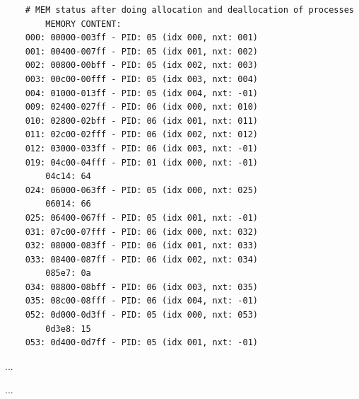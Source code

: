 \documentclass[a4paper]{article}
\begin{document}
	\begin{lstlisting}
	# MEM status after doing allocation and deallocation of processes
    	MEMORY CONTENT: 
    000: 00000-003ff - PID: 05 (idx 000, nxt: 001)
    001: 00400-007ff - PID: 05 (idx 001, nxt: 002)
    002: 00800-00bff - PID: 05 (idx 002, nxt: 003)
    003: 00c00-00fff - PID: 05 (idx 003, nxt: 004)
    004: 01000-013ff - PID: 05 (idx 004, nxt: -01)
    009: 02400-027ff - PID: 06 (idx 000, nxt: 010)
    010: 02800-02bff - PID: 06 (idx 001, nxt: 011)
    011: 02c00-02fff - PID: 06 (idx 002, nxt: 012)
    012: 03000-033ff - PID: 06 (idx 003, nxt: -01)
    019: 04c00-04fff - PID: 01 (idx 000, nxt: -01)
    	04c14: 64
    024: 06000-063ff - PID: 05 (idx 000, nxt: 025)
    	06014: 66
    025: 06400-067ff - PID: 05 (idx 001, nxt: -01)
    031: 07c00-07fff - PID: 06 (idx 000, nxt: 032)
    032: 08000-083ff - PID: 06 (idx 001, nxt: 033)
    033: 08400-087ff - PID: 06 (idx 002, nxt: 034)
    	085e7: 0a
    034: 08800-08bff - PID: 06 (idx 003, nxt: 035)
    035: 08c00-08fff - PID: 06 (idx 004, nxt: -01)
    052: 0d000-0d3ff - PID: 05 (idx 000, nxt: 053)
    	0d3e8: 15
    053: 0d400-0d7ff - PID: 05 (idx 001, nxt: -01)
	\end{lstlisting}
	\newpage 
\begin{appendix}
  \listoffigures
\end{appendix}

\begin{thebibliography}{80}


...


...


\end{thebibliography}
\end{document}
